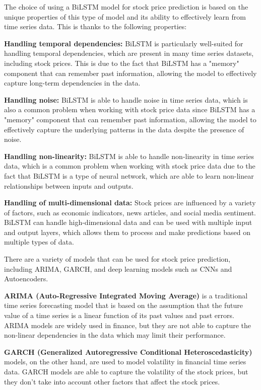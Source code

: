 \documentclass[a4paper]{article}
\begin{document}
The choice of using a BiLSTM model for stock price prediction is based on the unique properties of this type of model and its ability to effectively learn from time series data. This is thanks to the following properties:

\textbf{Handling temporal dependencies:} BiLSTM is particularly well-suited for handling temporal dependencies, which are present in many time series datasets, including stock prices. This is due to the fact that BiLSTM has a "memory" component that can remember past information, allowing the model to effectively capture long-term dependencies in the data.

\textbf{Handling noise:} BiLSTM is able to handle noise in time series data, which is also a common problem when working with stock price data since BiLSTM has a "memory" component that can remember past information, allowing the model to effectively capture the underlying patterns in the data despite the presence of noise.

\textbf{Handling non-linearity:} BiLSTM is able to handle non-linearity in time series data, which is a common problem when working with stock price data due to the fact that BiLSTM is a type of neural network, which are able to learn non-linear relationships between inputs and outputs.

\textbf{Handling of multi-dimensional data:} Stock prices are influenced by a variety of factors, such as economic indicators, news articles, and social media sentiment. BiLSTM can handle high-dimensional data and can be used with multiple input and output layers, which allows them to process and make predictions based on multiple types of data.

There are a variety of models that can be used for stock price prediction, including ARIMA, GARCH, and deep learning models such as CNNs and Autoencoders. 

\textbf{ARIMA (Auto-Regressive Integrated Moving Average)} is a traditional time series forecasting model that is based on the assumption that the future value of a time series is a linear function of its past values and past errors. ARIMA models are widely used in finance, but they are not able to capture the non-linear dependencies in the data which may limit their performance.

\textbf{GARCH (Generalized Autoregressive Conditional Heteroscedasticity)} models, on the other hand, are used to model volatility in financial time series data. GARCH models are able to capture the volatility of the stock prices, but they don't take into account other factors that affect the stock prices.
\end{document}
